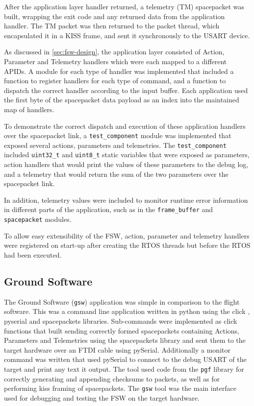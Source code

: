 \documentclass[../report.tex]{subfiles}
\begin{document}
After the application layer handler returned, a telemetry (TM) spacepacket was
built, wrapping the exit code and any returned data from the application
handler. The TM packet was then returned to the packet thread, which
encapsulated it in a KISS frame, and sent it synchronously to the USART device.

As discussed in \autoref{sec:fsw-design}, the application layer consisted of
Action, Parameter and Telemetry handlers which were each mapped to a different
APIDs. A module for each type of handler was implemented that included a
function to register handlers for each type of command, and a function to
dispatch the correct handler according to the input buffer. Each application
used the first byte of the spacepacket data payload as an index into the
maintained map of handlers.

To demonstrate the correct dispatch and execution of these application handlers
over the spacepacket link, a \lstinline|test_component| module was implemented
that exposed several actions, parameters and telemetries. The
\lstinline|test_component| included \lstinline|uint32_t| and
\lstinline|uint8_t| static variables that were exposed as parameters, action
handlers that would print the values of these parameters to the debug log, and
a telemetry that would return the sum of the two parameters over the
spacepacket link.

In addition, telemetry values were included to monitor runtime error
information in different parts of the application, such as in the
\lstinline|frame_buffer| and \lstinline|spacepacket| modules.

To allow easy extensibility of the FSW, action, parameter and telemetry
handlers were registered on start-up after creating the RTOS threads but before
the RTOS had been executed.

\subsection{Ground Software}

The Ground Software (\lstinline|gsw|) application was simple in comparison to
the flight software. This was a command line application written in python
using the click \citep{click}, pyserial \citep{pyserial} and spacepackets
\citep{spacepackets} libraries. Sub-commands were implemented as click
functions that built sending correctly formed spacepackets containing Actions,
Parameters and Telemetries using the spacepackets library and sent them to the
target hardware over an FTDI cable using pySerial. Additionally a monitor
command was written that used pySerial to connect to the debug USART of the
target and print any text it output. The tool used code from  the
\lstinline|pgf| library for correctly generating and appending checksums to
packets, as well as for performing kiss framing of spacepackets. The
\lstinline|gsw| tool was the main interface used for debugging and testing the
FSW on the target hardware.
\end{document}
